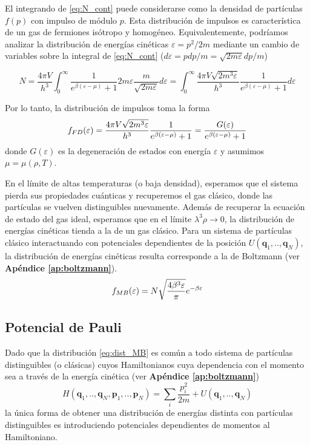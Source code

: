 El integrando de \eqref{eq:N_cont} puede considerarse como la densidad de partículas $f(p)$ con impulso de módulo $p$.
Esta distribución de impulsos es característica de un gas de fermiones isótropo y homogéneo.
Equivalentemente, podríamos analizar la distribución de energías cinéticas $\varepsilon=p^2/2m$ mediante un cambio de variables sobre la integral de \eqref{eq:N_cont}
($d\varepsilon = pdp/m = \sqrt{2m\varepsilon}dp/m$)

\[ N = \frac{4\pi V}{h^3} \int_0^\infty \frac{1}{e^{\beta(\varepsilon-\mu)}+1} 2m\varepsilon\frac{m}{\sqrt{2m\varepsilon}}d\varepsilon =
\int_0^\infty \frac{4\pi V\sqrt{2m^3\varepsilon}}{h^3}\frac{1}{e^{\beta(\varepsilon-\mu)}+1} d\varepsilon\]

Por lo tanto, la distribución de impulsos toma la forma
\begin{equation}{\label{eq:dist_FD}}
 f_{FD}(\varepsilon) = \frac{4\pi V \sqrt{2m^3\varepsilon}}{h^3}\frac{1}{e^{\beta(\varepsilon-\mu)}+1} = \frac{G(\varepsilon)}{e^{\beta(\varepsilon-\mu)}+1}
\end{equation}
donde $G(\varepsilon)$ es la degeneración de estados con energía $\varepsilon$ y asumimos $\mu=\mu(\rho,T)$.

En el límite de altas temperaturas (o baja densidad), esperamos que el sistema pierda sus propiedades cuánticas y recuperemos el gas clásico, donde las partículas
se vuelven distinguibles nuevamente.
Además de recuperar la ecuación de estado del gas ideal, esperamos que en el límite $\lambda^3\rho\to0$, la distribución de energías cinéticas tienda a la de un gas clásico.
Para un sistema de partículas clásico interactuando con potenciales dependientes de la posición $U(\mathbf{q}_1,..,\mathbf{q}_N)$, la distribución de energías cinéticas resulta
corresponde a la de Boltzmann (ver \textbf{Apéndice \ref{ap:boltzmann}}).
\begin{equation}{\label{eq:dist_MB}}
 f_{MB}(\varepsilon) = N\sqrt{\frac{4\beta^3\varepsilon}{\pi}}e^{-\beta\varepsilon}
\end{equation}



\subsection{Potencial de Pauli}{\label{sec:intro_pauli}}

Dado que la distribución \eqref{eq:dist_MB} es común a todo sistema de partículas distinguibles (o clásicas) cuyos Hamiltonianos cuya dependencia con el momento
sea a través de la energía cinética (ver  \textbf{Apéndice \ref{ap:boltzmann}})
\[ H(\mathbf{q}_1,..,\mathbf{q}_N,\mathbf{p}_1,..,\mathbf{p}_N) = \sum_i \frac{p_i^2}{2m} + U(\mathbf{q}_1,..,\mathbf{q}_N)\]
la única forma de obtener una distribución de energías distinta con partículas distinguibles es introduciendo potenciales dependientes de momentos al Hamiltoniano.

